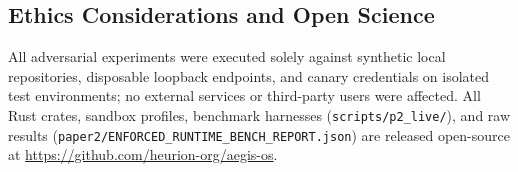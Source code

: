 \documentclass[10pt,twocolumn]{article}
\begin{document}
\subsection*{Ethics Considerations and Open Science}
All adversarial experiments were executed solely against synthetic local repositories, disposable loopback endpoints, and canary credentials on isolated test environments; no external services or third-party users were affected. All Rust crates, sandbox profiles, benchmark harnesses (\texttt{scripts/p2\_live/}), and raw results (\texttt{paper2/ENFORCED\_RUNTIME\_BENCH\_REPORT.json}) are released open-source at \url{https://github.com/heurion-org/aegis-os}.



\end{document}
